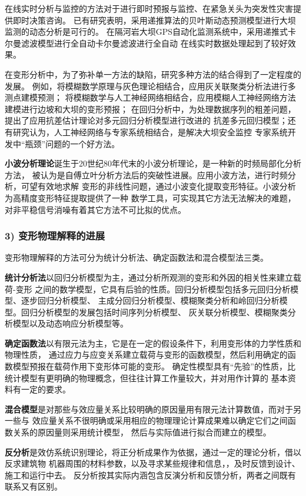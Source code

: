 在线实时分析与监控的方法对于进行即时预报与监控、在紧急关头为突发性灾害提供即时决策咨询。
已有研究表明，采用递推算法的贝叶斯动态预测模型进行大坝监测的动态分析是可行的。
在隔河岩大坝GPS自动化监测系统中，采用递推式卡尔曼滤波模型进行全自动卡尔曼滤波进行全自动
在线实时数据处理起到了较好效果。

在变形分析中，为了弥补单一方法的缺陷，研究多种方法的结合得到了一定程度的发展。
例如，将模糊数学原理与灰色理论相结合，应用灰关联聚类分析法进行多测点建模预测；
将模糊数学与人工神经网络相结合，应用模糊人工神经网络方法建模进行边坡和大坝的变形预报；
在回归分析中，为处理数据序列的粗差问题，提出了应用抗差估计理论对多元回归分析模型进行改进的
抗差多元回归模型；还有研究认为，人工神经网络与专家系统相结合，是解决大坝安全监控
专家系统开发中“瓶颈”问题的一个好方法。

\textbf{小波分析理论}诞生于20世纪80年代末的小波分析理论，是一种新的时频局部化分析方法，
被认为是自傅立叶分析方法后的突破性进展。应用小波方法，进行时频分析，可望有效地求解
变形的非线性问题，通过小波变化提取变形特征。小波分析为高精度变形特征提取提供了一种
数学工具，可实现其它方法无法解决的难题，
对非平稳信号消噪有着其它方法不可比拟的优点。

\subsubsection*{3) 变形物理解释的进展}
变形物理解释的方法可分为统计分析法、确定函数法和混合模型法三类。

\textbf{统计分析法}以回归分析模型为主，通过分析所观测的变形和外因的相关性来建立载荷-变形
之间的数学模型，它具有后验的性质。回归分析模型包括多元回归分析模型、逐步回归分析模型、
主成分回归分析模型、模糊聚类分析和岭回归分析模型。回归分析模型的发展包括时间序列分析模型、
灰关联分析模型、模糊聚类分析模型以及动态响应分析模型等。

\textbf{确定函数法}以有限元法为主，它是在一定的假设条件下，利用变形体的力学性质和物理性质，
通过应力与应变关系建立载荷与变形的函数模型，然后利用确定的函数模型预报在载荷作用下变形体可能的变形。
确定性模型具有“先验”的性质，比统计模型有更明确的物理概念，但往往计算工作量较大，并对用作计算的
基本资料有一定的要求。

\textbf{混合模型}是对那些与效应量关系比较明确的原因量用有限元法计算数值，而对于另一些与
效应量关系不很明确或采用相应的物理理论计算成果难以确定它们之间函数关系的原因量则采用统计模型，
然后与实际值进行拟合而建立的模型。

\textbf{反分析}是效仿系统识别理论，将正分析成果作为依据，通过一定的理论分析，借以反求建筑物
机器周围的材料参数，以及寻求某些规律和信息，，及时反馈到设计、施工和运行中去。
反分析按其实际内涵包含反演分析和反馈分析，两者之间既有联系又有区别。

